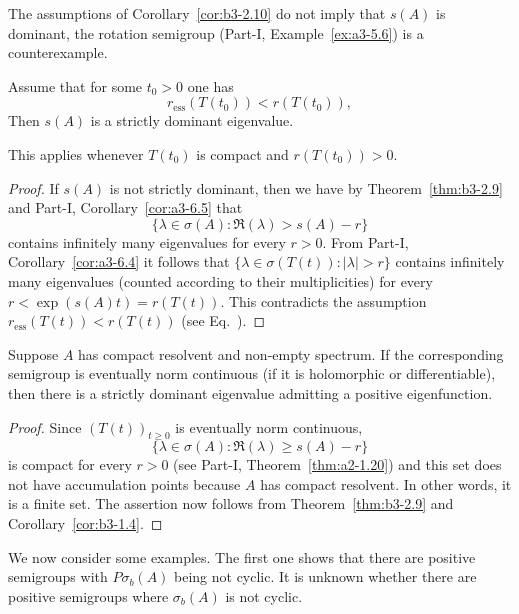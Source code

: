 The assumptions of Corollary~\ref{cor:b3-2.10} do not imply that $s(A)$ is dominant, the rotation semigroup (Part-I, Example~\ref{ex:a3-5.6}) is a counterexample.
\begin{corollary}\label{cor:b3-2.11}
	Assume that for some $t_{0} > 0$ one has 
    \[
    r_{\text{ess}}(T(t_{0})) < r(T(t_{0})), 
    \]
	Then $s(A)$ is a strictly dominant eigenvalue.

    This applies \eg whenever $T(t_{0})$ is compact and $r(T(t_{0})) > 0$.
\end{corollary}
\begin{proof}
	If\/ $s(A)$ is not strictly dominant, then we have by Theorem~\ref{thm:b3-2.9} and Part-I, Corollary~\ref{cor:a3-6.5} that 
    \[
    \{\lambda \in \sigma(A) \colon \Re(\lambda) > s(A) - r\}
    \]
    contains infinitely many eigenvalues for every $r > 0$.
	From Part-I, Corollary~\ref{cor:a3-6.4} it follows that $\{\lambda \in \sigma(T(t)) \colon |\lambda| > r\}$ contains infinitely many eigenvalues (counted according to their multiplicities) for every $r < \exp(s(A)t) = r(T(t))$.
	This contradicts the assumption $r_{\text{ess}}(T(t)) < r(T(t))$ (see Eq.~).
\end{proof}
\begin{corollary}\label{cor:b3-2.12}
	Suppose $A$ has compact resolvent and non-empty spectrum.
	If the corresponding semigroup is eventually norm continuous (\eg if it is holomorphic or differentiable), then there is a strictly dominant eigenvalue admitting a positive eigenfunction.
\end{corollary}
\begin{proof}
	Since $(T(t))_{t \geq 0}$ is eventually norm continuous, 
    \[
    \{\lambda \in \sigma(A) \colon \Re(\lambda) \geq s(A)-r\}
    \]
    is compact for every $r > 0$ (see Part-I, Theorem~\ref{thm:a2-1.20}) and this set does not have accumulation points because $A$ has compact resolvent.
	In other words, it is a finite set.
	The assertion now follows from Theorem~\ref{thm:b3-2.9} and Corollary~\ref{cor:b3-1.4}.
\end{proof}
We now consider some examples. 
The first one shows that there are positive semigroups with $P\sigma_{b}(A)$ being not cyclic.
It is unknown whether there are positive semigroups where $\sigma_{b}(A)$ is not cyclic.

